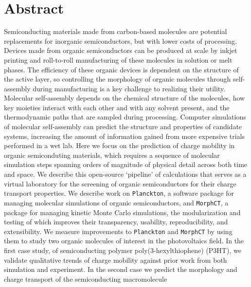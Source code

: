 
\chapter*{Abstract}

Semiconducting materials made from carbon-based molecules are potential replacements for inorganic semiconductors, but with lower costs of processing.
Devices made from organic semiconductors can be produced at scale by inkjet printing and roll-to-roll manufacturing of these molecules in solution or melt phases.  
The efficiency of these organic devices is dependent on the structure of the active layer, so controlling the morphology of organic molecules through self-assembly during manufacturing is a key challenge to realizing their utility.
Molecular self-assembly depends on the chemical structure of the molecules, how key moieties interact with each other and with any solvent present, and the thermodynamic paths that are sampled during processing.
Computer simulations of molecular self-assembly can predict the structure and properties of candidate systems, increasing the amount of information gained from more expensive trials performed in a wet lab.
Here we focus on the prediction of charge mobility in organic semiconduting materials,
which requires a sequence of molecular simulation steps spanning orders of magnitude of physical detail across both time and space.
We describe this open-source `pipeline' of calculations that serves as a virtual laboratory for the screening of organic semiconductors for their charge transport properties.
We describe work on \texttt{Planckton}, a software package for managing molecular simulations of organic semiconductors, and \texttt{MorphCT},
a package for managing kinetic Monte Carlo simulations, the modularization and testing of which improves their transparency, usability, reproducibility, and extensibility.
We measure improvements to \texttt{Planckton} and \texttt{MorphCT} by using them to study two organic molecules of interest in the photovoltaics field.
In the first case study, of semiconducting polymer poly(3-hexylthiophene) (P3HT), 
we validate qualitative trends of charge mobility against prior work from both simulation and experiment.
In the second case we predict the morphology and charge transport of the semiconducting macromolecule 
